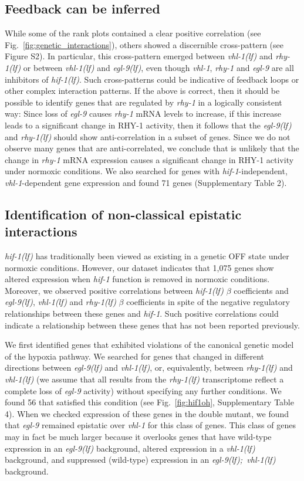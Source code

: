 \documentclass[9pt,twocolumn,twoside]{pnas-new}
\newcommand{\gene}[1]{\mbox{\emph{#1}}}
\newcommand{\egl}{\gene{egl-9(lf)}}
\newcommand{\rhy}{\gene{rhy-1(lf)}}
\newcommand{\vhl}{\gene{vhl-1(lf)}}
\newcommand{\eglvhl}{\gene{egl-9(lf); vhl-1(lf)}}
\newcommand{\hif}{\gene{hif-1(lf)}}
\newcommand{\hifn}{1,075}
\newcommand{\vhltargets}{71} %
\newcommand{\hifohtargets}{56}
\begin{document}
\subsection*{Feedback can be inferred}
\label{sub:topology}
While some of the rank plots contained a clear positive correlation (see
Fig.~\ref{fig:genetic_interactions}), others showed a discernible cross-pattern
(see Figure S2). In particular, this cross-pattern emerged between \vhl{} and
\rhy{} or between \vhl{} and \egl{}, even though \gene{vhl-1}, \gene{rhy-1} and
\gene{egl-9} are all inhibitors of \hif{}. Such cross-patterns could be
indicative of feedback loops or other complex interaction patterns. If the above
is correct, then it should be possible to identify genes that are regulated by
\gene{rhy-1} in a logically consistent way: Since loss of \gene{egl-9} causes
\gene{rhy-1} mRNA levels to increase, if this increase leads to a significant
change in RHY-1 activity, then it follows that the \egl{} and \rhy{} should show
anti-correlation in a subset of genes. Since we do not observe many genes that
are anti-correlated, we conclude that is unlikely that the change in
\gene{rhy-1} mRNA expression causes a significant change in RHY-1 activity under
normoxic conditions. We also searched for genes with \gene{hif-1}-independent,
\gene{vhl-1}-dependent gene expression and found \vhltargets{} genes
(Supplementary Table 2).

\subsection*{Identification of non-classical epistatic interactions}
\label{sub:hifoh}
\hif{} has traditionally been viewed as existing in a genetic OFF state under
normoxic conditions. However, our dataset indicates that \hifn{} genes show
altered expression when \gene{hif-1} function is removed in normoxic conditions.
Moreover, we observed positive correlations between \hif{} $\beta$ coefficients
and \egl{}, \vhl{} and \rhy{} $\beta$ coefficients in spite of the negative
regulatory relationships between these genes and \gene{hif-1}. Such positive
correlations could indicate a relationship between these genes that has not
been reported previously.

We first identified genes that exhibited violations of the canonical genetic
model of the hypoxia pathway. We searched for genes that changed in different
directions between \egl{} and \vhl{}, or, equivalently, between \rhy{} and
\vhl{} (we assume that all results from the \rhy{} transcriptome reflect a
complete loss of \gene{egl-9} activity) without specifying any further
conditions. We found \hifohtargets{} that satisfied this condition (see
Fig.~\ref{fig:hif1oh}, Supplementary Table 4). When we checked expression of
these genes in the double mutant, we found that \gene{egl-9} remained epistatic
over \gene{vhl-1} for this class of genes. This class of genes may in fact be
much larger because it overlooks genes that have wild-type expression in an
\egl{} background, altered expression in a \vhl{} background, and suppressed
(wild-type) expression  in an \eglvhl{} background.
\end{document}
